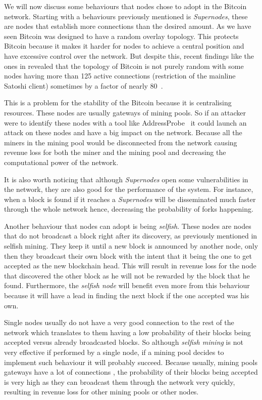 We will now discuss some behaviours that nodes chose to adopt in the Bitcoin network. Starting with a behaviours previously mentioned is \textsl{Supernodes}, these are nodes that establish more connections than the desired amount. As we have seen Bitcoin was designed to have a random overlay topology. This protects Bitcoin because it makes it harder for nodes to achieve a central position and have excessive control over the network. But despite this, recent findings like the ones in \cite{miller2015discovering} revealed that the topology of Bitcoin is not purely random with some nodes having more than 125 active connections (restriction of the mainline Satoshi client) sometimes by a factor of nearly 80~\cite{miller2015discovering}.

This is a problem for the stability of the Bitcoin because it is centralising resources. These nodes are usually gateways of mining pools. So if an attacker were to identify these nodes with a tool like AddressProbe~\cite{miller2015discovering} it could launch an attack on these nodes and have a big impact on the network. Because all the miners in the mining pool would be disconnected from the network causing revenue loss for both the miner and the mining pool and decreasing the computational power of the network.

It is also worth noticing that although \textsl{Supernodes} open some vulnerabilities in the network, they are also good for the performance of the system. For instance, when a block is found if it reaches a \textsl{Supernodes} will be disseminated much faster through the whole network hence, decreasing the probability of forks happening.

Another behaviour that nodes can adopt is being \textsl{selfish}. These nodes are nodes that do not broadcast a block right after its discovery, as previously mentioned in selfish mining. They keep it until a new block is announced by another node, only then they broadcast their own block with the intent that it being the one to get accepted as the new blockchain head. This will result in revenue loss for the node that discovered the other block as he will not be rewarded by the block that he found. Furthermore, the \textit{selfish node} will benefit even more from this behaviour because it will have a lead in finding the next block if the one accepted was his own.

Single nodes usually do not have a very good connection to the rest of the network which translates to them having a low probability of their blocks being accepted versus already broadcasted blocks. So although \textit{selfish mining} is not very effective if performed by a single node, if a mining pool decides to implement such behaviour it will probably succeed. Because usually, mining pools gateways have a lot of connections \cite{miller2015discovering}, the probability of their blocks being accepted is very high as they can broadcast them through the network very quickly, resulting in revenue loss for other mining pools or other nodes.

